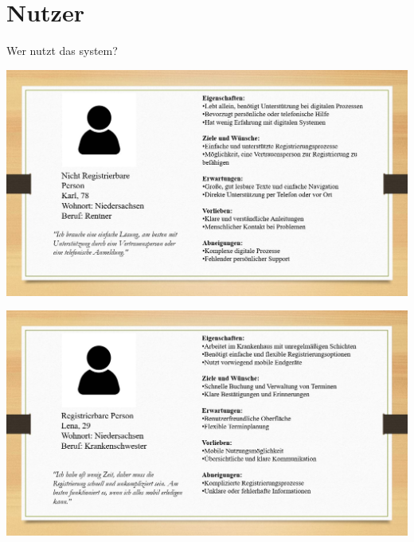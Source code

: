 \section*{Nutzer}
Wer nutzt das system?

\begin{center}
  \includegraphics[width=0.95\linewidth, height=0.45\textheight, keepaspectratio]{src/abbildungen/persona1.png}
\end{center}

\begin{center}
  \includegraphics[width=0.95\linewidth, height=0.45\textheight, keepaspectratio]{src/abbildungen/persona2.png}
\end{center}



